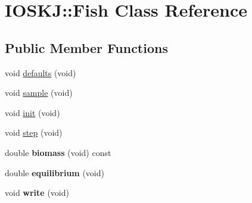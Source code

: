 \hypertarget{classIOSKJ_1_1Fish}{\section{I\-O\-S\-K\-J\-:\-:Fish Class Reference}
\label{classIOSKJ_1_1Fish}
}
\subsection*{Public Member Functions}
\begin{DoxyCompactItemize}
\item 
void \hyperlink{classIOSKJ_1_1Fish_ad787d9334e8699d000825066fd546bc0}{defaults} (void)
\item 
void \hyperlink{classIOSKJ_1_1Fish_aff50e418c8b3917583430b9b421573df}{sample} (void)
\item 
void \hyperlink{classIOSKJ_1_1Fish_a5e536120fdadc3302e76270f6876cf14}{init} (void)
\item 
void \hyperlink{classIOSKJ_1_1Fish_a490ad0b072fac8f0392ecd2da9598c20}{step} (void)
\item 
\hypertarget{classIOSKJ_1_1Fish_a61462d0474ff5086919d6010a7cfdeba}{double {\bfseries biomass} (void) const }\label{classIOSKJ_1_1Fish_a61462d0474ff5086919d6010a7cfdeba}

\item 
\hypertarget{classIOSKJ_1_1Fish_aa5cd14669e73f889a3309bf824932a7e}{double {\bfseries equilibrium} (void)}\label{classIOSKJ_1_1Fish_aa5cd14669e73f889a3309bf824932a7e}

\item 
\hypertarget{classIOSKJ_1_1Fish_acc75a82f519733d425816e31b17c8fdf}{void {\bfseries write} (void)}\label{classIOSKJ_1_1Fish_acc75a82f519733d425816e31b17c8fdf}

\end{DoxyCompactItemize}
